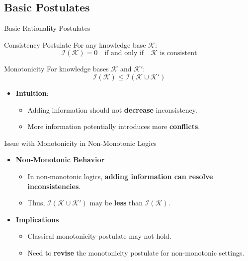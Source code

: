 \subsection{Basic Postulates}

\begin{frame}{Basic Rationality Postulates}
    \begin{block}{Consistency Postulate}
        For any knowledge base \( \mathcal{K} \):
        \[
            \mathcal{I}(\mathcal{K}) = 0 \quad \text{if and only if} \quad \mathcal{K} \text{ is consistent}
        \]
    \end{block}
    \begin{alertblock}{Monotonicity}
        For knowledge bases \( \mathcal{K} \) and \( \mathcal{K}' \):
        \[
            \mathcal{I}(\mathcal{K}) \leq \mathcal{I}(\mathcal{K} \cup \mathcal{K}')
        \]
    \end{alertblock}
    \begin{itemize}
        \item \textbf{Intuition}:
              \begin{itemize}
                  \item Adding information should not \textbf{decrease} inconsistency.
                  \item More information potentially introduces more \textbf{conflicts}.
              \end{itemize}
    \end{itemize}
\end{frame}

\begin{frame}{Issue with Monotonicity in Non-Monotonic Logics}
    \begin{itemize}
        \item \textbf{Non-Monotonic Behavior}
              \begin{itemize}
                  \item In non-monotonic logics, \textbf{adding information can resolve inconsistencies}.
                  \item Thus, \( \mathcal{I}(\mathcal{K} \cup \mathcal{K}') \) may be \textbf{less} than \( \mathcal{I}(\mathcal{K}) \).
              \end{itemize}
        \item \textbf{Implications}
              \begin{itemize}
                  \item Classical monotonicity postulate may not hold.
                  \item Need to \textbf{revise} the monotonicity postulate for non-monotonic settings.
              \end{itemize}
    \end{itemize}
\end{frame}

